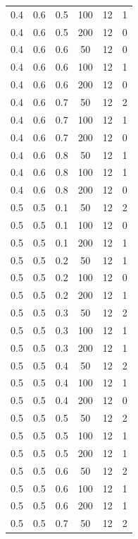 \documentclass[a4paper,14pt, unknownkeysallowed]{extreport}
\begin{document}
\begin{center}
\begin{longtable}[c]{|c|c|c|c|c|c|}
	0.4 &  0.6 &  0.5 &  100 &    12 &     1 \\
	0.4 &  0.6 &  0.5 &  200 &    12 &     0 \\
   \hline
	0.4 &  0.6 &  0.6 &   50 &    12 &     0 \\
	0.4 &  0.6 &  0.6 &  100 &    12 &     1 \\
	0.4 &  0.6 &  0.6 &  200 &    12 &     0 \\
   \hline
	0.4 &  0.6 &  0.7 &   50 &    12 &     2 \\
	0.4 &  0.6 &  0.7 &  100 &    12 &     1 \\
	0.4 &  0.6 &  0.7 &  200 &    12 &     0 \\
   \hline
	0.4 &  0.6 &  0.8 &   50 &    12 &     1 \\
	0.4 &  0.6 &  0.8 &  100 &    12 &     1 \\
	0.4 &  0.6 &  0.8 &  200 &    12 &     0 \\
   \hline
	0.5 &  0.5 &  0.1 &   50 &    12 &     2 \\
	0.5 &  0.5 &  0.1 &  100 &    12 &     0 \\
	0.5 &  0.5 &  0.1 &  200 &    12 &     1 \\
   \hline
	0.5 &  0.5 &  0.2 &   50 &    12 &     1 \\
	0.5 &  0.5 &  0.2 &  100 &    12 &     0 \\
	0.5 &  0.5 &  0.2 &  200 &    12 &     1 \\
   \hline
	0.5 &  0.5 &  0.3 &   50 &    12 &     2 \\
	0.5 &  0.5 &  0.3 &  100 &    12 &     1 \\
	0.5 &  0.5 &  0.3 &  200 &    12 &     1 \\
   \hline
	0.5 &  0.5 &  0.4 &   50 &    12 &     2 \\
	0.5 &  0.5 &  0.4 &  100 &    12 &     1 \\
	0.5 &  0.5 &  0.4 &  200 &    12 &     0 \\
   \hline
	0.5 &  0.5 &  0.5 &   50 &    12 &     2 \\
	0.5 &  0.5 &  0.5 &  100 &    12 &     1 \\
	0.5 &  0.5 &  0.5 &  200 &    12 &     1 \\
   \hline
	0.5 &  0.5 &  0.6 &   50 &    12 &     2 \\
	0.5 &  0.5 &  0.6 &  100 &    12 &     1 \\
	0.5 &  0.5 &  0.6 &  200 &    12 &     1 \\
   \hline
	0.5 &  0.5 &  0.7 &   50 &    12 &     2 \\

\end{longtable}
\end{center}
\end{document}
